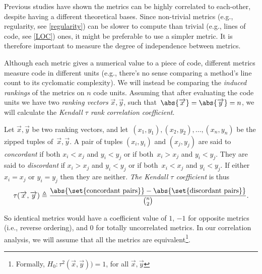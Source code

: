 \label{auto-correlation}
Previous studies have shown the metrics can be highly correlated to each-other\cite{Herraiz:et:al:07, Shepperd:88}, despite having a different theoretical bases.
Since non-trivial metrics (e.g., regularity, see \ref{regularity}) can be slower to compute than trivial (e.g., lines of code, see \ref{LOC}) ones, it might be preferable to use a simpler metric.
It is therefore important to measure the degree of independence between metrics.

Although each metric gives a numerical value to a piece of code, different metrics measure code in different units (e.g., there's no sense comparing a method's line count to its cyclomatic complexity).
We will instead be comparing the \emph{induced rankings} of the metrics on $n$ code units. Assuming that after evaluating the code units we have two \emph{ranking vectors} $\overrightarrow{x}, \overrightarrow{y}$, such that~$\abs{\overrightarrow{x}}=\abs{\overrightarrow{y}}=n$, we will calculate the \emph{Kendall $\tau$ rank correlation coefficient}.
\begin{define}
	Let $\overrightarrow{x}, \overrightarrow{y}$ be two ranking vectors, and let~$(x_1,y_1),(x_2,y_2),\ldots,(x_n,y_n)$ be the zipped tuples of~$\overrightarrow{x}, \overrightarrow{y}$. A pair of tuples $(x_i,y_i)$ and $(x_j,y_j)$ are said to \emph{concordant} if both $x_i<x_j$ and $y_i<y_j$ or if both~$x_i>x_j$ and $y_i<y_j$. They are said to \emph{discordant} if $x_i>x_j$ and $y_i<y_j$ or if both~$x_i<x_j$ and $y_i<y_j$. If either~$x_i=x_j$ or $y_i=y_j$ then they are neither. \emph{The Kendall $\tau$ coefficient} is thus
	$$\tau(\overrightarrow{x}, \overrightarrow{y})\triangleq \frac{\abs{\set{\text{concordant~pairs}}} - \abs{\set{\text{discordant pairs}}}}{{n \choose 2}}.$$
\end{define}
So identical metrics would have a coefficient value of $1$, $-1$ for opposite metrics (i.e., reverse ordering), and $0$ for totally uncorrelated metrics.
In our correlation analysis, we will assume that all the metrics are equivalent\footnote{Formally, $H_0: \tau^2(\overrightarrow{x}, \overrightarrow{y}))=1$, for all $\overrightarrow{x}, \overrightarrow{y}$}.